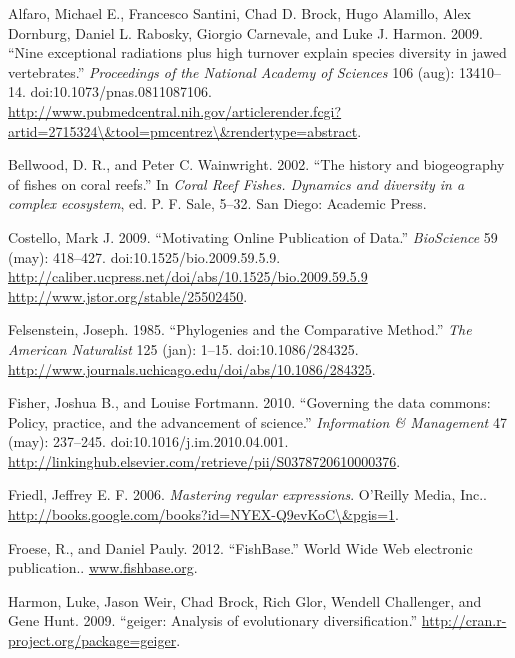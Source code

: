\documentclass[author-year]{elsarticle} %
\begin{document}
Alfaro, Michael E., Francesco Santini, Chad D. Brock, Hugo Alamillo,
Alex Dornburg, Daniel L. Rabosky, Giorgio Carnevale, and Luke J. Harmon.
2009. ``Nine exceptional radiations plus high turnover explain species
diversity in jawed vertebrates.'' \emph{Proceedings of the National
Academy of Sciences} 106 (aug): 13410--14. doi:10.1073/pnas.0811087106.
\href{http://www.pubmedcentral.nih.gov/articlerender.fcgi?artid=2715324\textbackslash{}\&tool=pmcentrez\textbackslash{}\&rendertype=abstract}{http://www.pubmedcentral.nih.gov/articlerender.fcgi?artid=2715324\textbackslash{}\&tool=pmcentrez\textbackslash{}\&rendertype=abstract}.

Bellwood, D. R., and Peter C. Wainwright. 2002. ``The history and
biogeography of fishes on coral reefs.'' In \emph{Coral Reef Fishes.
Dynamics and diversity in a complex ecosystem}, ed. P. F. Sale, 5--32.
San Diego: Academic Press.

Costello, Mark J. 2009. ``Motivating Online Publication of Data.''
\emph{BioScience} 59 (may): 418--427. doi:10.1525/bio.2009.59.5.9.
\href{http://caliber.ucpress.net/doi/abs/10.1525/bio.2009.59.5.9 http://www.jstor.org/stable/25502450}{http://caliber.ucpress.net/doi/abs/10.1525/bio.2009.59.5.9
http://www.jstor.org/stable/25502450}.

Felsenstein, Joseph. 1985. ``Phylogenies and the Comparative Method.''
\emph{The American Naturalist} 125 (jan): 1--15. doi:10.1086/284325.
\href{http://www.journals.uchicago.edu/doi/abs/10.1086/284325}{http://www.journals.uchicago.edu/doi/abs/10.1086/284325}.

Fisher, Joshua B., and Louise Fortmann. 2010. ``Governing the data
commons: Policy, practice, and the advancement of science.''
\emph{Information \& Management} 47 (may): 237--245.
doi:10.1016/j.im.2010.04.001.
\href{http://linkinghub.elsevier.com/retrieve/pii/S0378720610000376}{http://linkinghub.elsevier.com/retrieve/pii/S0378720610000376}.

Friedl, Jeffrey E. F. 2006. \emph{Mastering regular expressions}.
O'Reilly Media, Inc..
\href{http://books.google.com/books?id=NYEX-Q9evKoC\textbackslash{}\&pgis=1}{http://books.google.com/books?id=NYEX-Q9evKoC\textbackslash{}\&pgis=1}.

Froese, R., and Daniel Pauly. 2012. ``FishBase.'' World Wide Web
electronic publication.. \href{www.fishbase.org}{www.fishbase.org}.

Harmon, Luke, Jason Weir, Chad Brock, Rich Glor, Wendell Challenger, and
Gene Hunt. 2009. ``geiger: Analysis of evolutionary diversification.''
\href{http://cran.r-project.org/package=geiger}{http://cran.r-project.org/package=geiger}.
\end{document}
